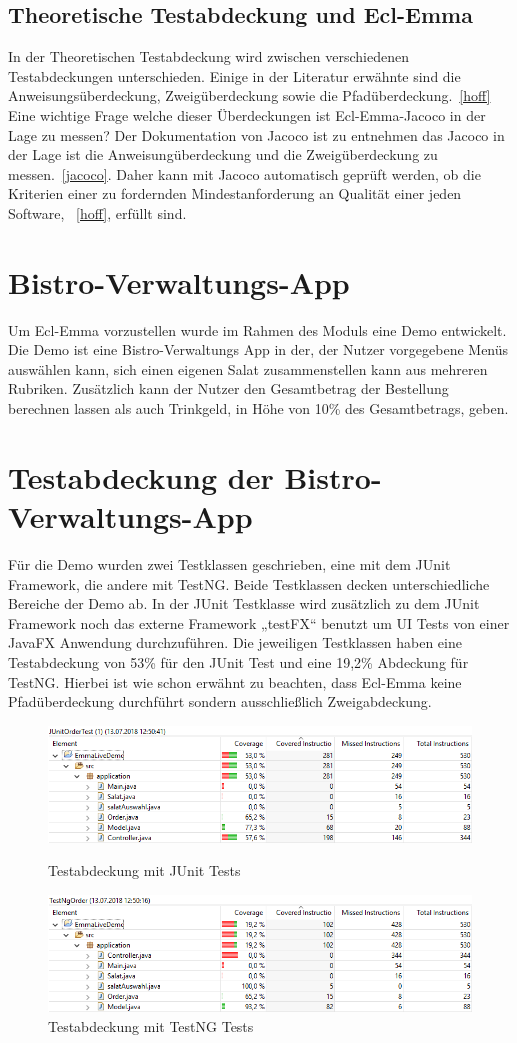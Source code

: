 \documentclass[a4paper]{article}
\begin{document}
\subsection{Theoretische Testabdeckung und Ecl-Emma}
In der Theoretischen Testabdeckung wird zwischen verschiedenen Testabdeckungen unterschieden. Einige in der Literatur erwähnte sind die Anweisungsüberdeckung, Zweigüberdeckung sowie die Pfadüberdeckung.~\ref{hoff}
Eine wichtige Frage welche dieser Überdeckungen ist Ecl-Emma-Jacoco  in der Lage zu messen? Der Dokumentation von Jacoco ist zu entnehmen das Jacoco in der Lage ist die Anweisungüberdeckung und die Zweigüberdeckung zu messen.~\ref{jacoco}. Daher kann mit Jacoco automatisch geprüft werden, ob die Kriterien einer zu fordernden Mindestanforderung an Qualität einer jeden Software, ~\ref{hoff}, erfüllt sind.
\section{Bistro-Verwaltungs-App}
Um Ecl-Emma vorzustellen wurde im Rahmen des Moduls eine Demo entwickelt. 
Die Demo ist eine Bistro-Verwaltungs App in der, der Nutzer vorgegebene Menüs auswählen kann, sich einen eigenen Salat zusammenstellen kann aus mehreren Rubriken. Zusätzlich kann der Nutzer den Gesamtbetrag der Bestellung berechnen lassen als auch Trinkgeld, in Höhe von 10\% des Gesamtbetrags, geben.
\section{Testabdeckung der Bistro-Verwaltungs-App}
Für die Demo wurden zwei Testklassen geschrieben, eine mit dem JUnit Framework, die andere mit TestNG. Beide Testklassen decken unterschiedliche Bereiche der Demo ab. 
In der JUnit Testklasse wird zusätzlich zu dem JUnit Framework noch das externe Framework „testFX“ benutzt um UI Tests von einer JavaFX Anwendung durchzuführen.
Die jeweiligen Testklassen haben eine Testabdeckung von 53\% für den JUnit Test und eine 19,2\% Abdeckung für TestNG. 
Hierbei ist wie schon erwähnt zu beachten, dass Ecl-Emma keine Pfadüberdeckung durchführt sondern ausschließlich Zweigabdeckung. 
\begin{figure}[h]
\includegraphics[scale=0.60 ]{Testabdeckung_JUnit.png}
\caption{Testabdeckung mit JUnit Tests}
\includegraphics[scale=0.60]{Testabdeckung_TestNG.png}
\caption{Testabdeckung mit TestNG Tests}
\centering
\end{figure}
\end{document}
